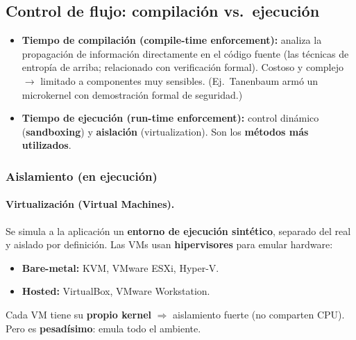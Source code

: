 \documentclass[../main.tex]{subfiles}
\begin{document}
\subsection{Control de flujo: compilación vs.\ ejecución}

\begin{itemize}
  \item \textbf{Tiempo de compilación (compile-time enforcement):} analiza la
        propagación de información directamente en el código fuente (las técnicas
        de entropía de arriba; relacionado con verificación formal). Costoso y
        complejo $\rightarrow$ limitado a componentes muy sensibles. (Ej.\
        Tanenbaum armó un microkernel con demostración formal de seguridad.)
  \item \textbf{Tiempo de ejecución (run-time enforcement):} control dinámico
        (\textbf{sandboxing}) y \textbf{aislación} (virtualization). Son los
        \textbf{métodos más utilizados}.
\end{itemize}

\subsubsection{Aislamiento (en ejecución)}

\paragraph{Virtualización (Virtual Machines).} Se simula a la aplicación un
\textbf{entorno de ejecución sintético}, separado del real y aislado por
definición. Las VMs usan \textbf{hipervisores} para emular hardware:
\begin{itemize}[noitemsep]
  \item \textbf{Bare-metal:} KVM, VMware ESXi, Hyper-V.
  \item \textbf{Hosted:} VirtualBox, VMware Workstation.
\end{itemize}
Cada VM tiene su \textbf{propio kernel} $\Rightarrow$ aislamiento fuerte (no
comparten CPU). Pero es \textbf{pesadísimo}: emula todo el ambiente.
\end{document}

